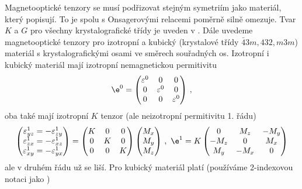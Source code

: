 Magnetooptické tenzory se musí podřizovat stejným symetriím jako materiál, který popisují.
To je spolu s Onsagerovými relacemi poměrně silně omezuje.
Tvar $K$ a $G$ pro všechny krystalografické třídy je uveden v \cite{Visbible}.
Dále uvedeme magnetooptické tenzory pro izotropní a kubický (krystalové třídy $\bar{4}3m, 432, m3m$) materiál s krystalografickými osami ve směrech souřadných os.
Izotropní i kubický materiál mají izotropní nemagnetickou permitivitu
\begin{equation}
\e^0=\begin{pmatrix}
\varepsilon^0 & 0 & 0 \\ 0 & \varepsilon^0 & 0 \\ 0 & 0 & \varepsilon^0
\end{pmatrix} \,,
\end{equation}
oba také mají izotropní $K$ tenzor (ale neizotropní permitivitu 1. řádu)
\begin{equation}
\begin{pmatrix}
\varepsilon^1_{yz}=-\varepsilon^1_{zy} \\ \varepsilon^1_{zx}=-\varepsilon^1_{xz} \\ \varepsilon^1_{xy}=-\varepsilon^1_{yx}\end{pmatrix}
=\begin{pmatrix}
K & 0 & 0 \\ 0 & K & 0 \\ 0 & 0 & K
\end{pmatrix}\begin{pmatrix}M_x \\ M_y \\ M_z\end{pmatrix} \,, \,\, \e^1= K \begin{pmatrix}
0 & M_z & -M_y \\
-M_z & 0 & M_x \\
M_y & -M_x & 0
\end{pmatrix}
\end{equation}
ale v druhém řádu už se liší. Pro kubický materiál platí (používáme 2-indexovou notaci jako \cite{Hamrlova})
